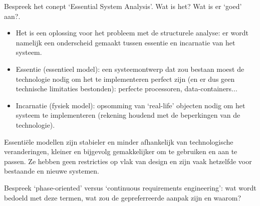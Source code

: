 \documentclass{article}
\begin{document}
\begin{quest}{}Bespreek het conept `Essential System Analysis'. Wat is het? Wat is er `goed' aan?.
\end{quest}
\begin{itemize}
    \item Het is een oplossing voor het probleem met de structurele analyse: er wordt namelijk een onderscheid gemaakt tussen essentie en incarnatie van het systeem.
    \item Essentie (essentieel model): een systeemontwerp dat zou bestaan moest de technologie nodig om het te implementeren perfect zijn (en er dus geen technische limitaties bestonden): perfecte processoren, data-containers...
    \item Incarnatie (fysiek model): opsomming van `real-life' objecten nodig om het systeem te implementeren (rekening houdend met de beperkingen van de technologie).
\end{itemize}
Essenti\"ele modellen zijn stabieler en minder afhankelijk van technologische veranderingen, kleiner en bijgevolg gemakkelijker om te gebruiken en aan te passen. Ze hebben geen restricties op vlak van design en zijn vaak hetzelfde voor bestaande en nieuwe systemen.

\begin{quest}{}Bespreek `phase-oriented' versus `continuous requirements engineering': wat wordt bedoeld met deze termen, wat zou de gepreferreerde aanpak zijn en waarom?
\end{quest}
\end{document}
